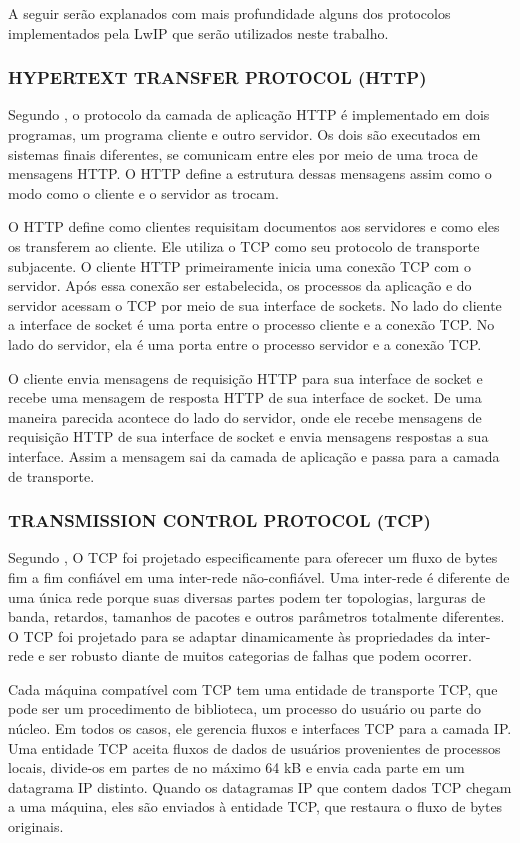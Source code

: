 A seguir serão explanados com mais profundidade alguns dos protocolos implementados pela LwIP que serão utilizados neste trabalho.

\subsubsection{HYPERTEXT TRANSFER PROTOCOL (HTTP)}
Segundo , o protocolo da camada de aplicação HTTP é implementado em dois programas, um programa cliente e outro servidor. Os dois são executados em sistemas finais diferentes, se comunicam entre eles por meio de uma troca de mensagens HTTP. O HTTP define a estrutura dessas mensagens assim como o modo como o cliente e o servidor as trocam. 

O HTTP define como clientes requisitam documentos aos servidores e como eles os transferem ao cliente. Ele utiliza o TCP como seu protocolo de transporte subjacente. O cliente HTTP primeiramente inicia uma conexão TCP com o servidor. Após essa conexão ser estabelecida, os processos da aplicação e do servidor acessam o TCP por meio de sua interface de sockets. No lado do cliente a interface de socket é uma porta entre o processo cliente e a conexão TCP. No lado do servidor, ela é uma porta entre o processo servidor  e a conexão TCP.

O cliente envia mensagens de requisição HTTP para sua interface de socket e recebe uma mensagem de resposta HTTP de sua interface de socket. De uma maneira parecida acontece do lado do servidor, onde ele recebe mensagens de requisição HTTP de sua interface de socket e envia mensagens respostas a sua interface. Assim a mensagem sai da camada de aplicação e passa para a camada de transporte. 

\subsubsection{TRANSMISSION CONTROL PROTOCOL (TCP)}

Segundo , O TCP foi projetado especificamente para oferecer um fluxo de bytes fim a fim confiável em uma inter-rede não-confiável. Uma inter-rede é diferente de uma única rede porque suas diversas partes podem ter topologias, larguras de banda, retardos, tamanhos de pacotes e outros parâmetros totalmente diferentes. O TCP foi projetado para se adaptar dinamicamente às propriedades da inter-rede e ser robusto diante de muitos categorias de falhas que podem ocorrer.

Cada máquina compatível com TCP tem uma entidade de transporte TCP, que pode ser um procedimento de biblioteca, um processo do usuário ou parte do núcleo. Em todos os casos, ele gerencia fluxos e interfaces TCP para a camada IP. Uma entidade TCP aceita fluxos de dados de usuários provenientes de processos locais, divide-os em partes de no máximo 64 kB e envia cada parte em um datagrama IP distinto. Quando os datagramas IP que contem dados TCP chegam a uma máquina, eles são enviados à entidade TCP, que restaura o fluxo de bytes originais.

